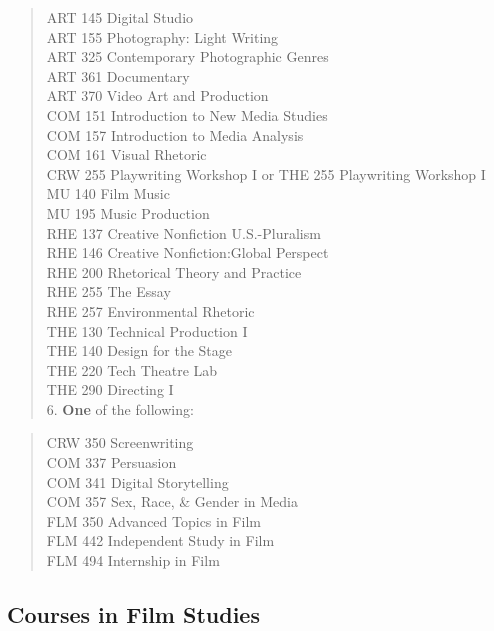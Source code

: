 \documentclass[
  letterpaper,
]{scrbook}
\begin{document}
\begin{quote}
ART 145 Digital Studio\\
ART 155 Photography: Light Writing\\
ART 325 Contemporary Photographic Genres\\
ART 361 Documentary\\
ART 370 Video Art and Production\\
COM 151 Introduction to New Media Studies\\
COM 157 Introduction to Media Analysis\\
COM 161 Visual Rhetoric\\
CRW 255 Playwriting Workshop I or THE 255 Playwriting Workshop I\\
MU 140 Film Music\\
MU 195 Music Production\\
RHE 137 Creative Nonfiction U.S.-Pluralism\\
RHE 146 Creative Nonfiction:Global Perspect\\
RHE 200 Rhetorical Theory and Practice\\
RHE 255 The Essay\\
RHE 257 Environmental Rhetoric\\
THE 130 Technical Production I\\
THE 140 Design for the Stage\\
THE 220 Tech Theatre Lab\\
THE 290 Directing I\\
6. \textbf{One} of the following:
\end{quote}

\begin{quote}
CRW 350 Screenwriting\\
COM 337 Persuasion\\
COM 341 Digital Storytelling\\
COM 357 Sex, Race, \& Gender in Media\\
FLM 350 Advanced Topics in Film\\
FLM 442 Independent Study in Film\\
FLM 494 Internship in Film
\end{quote}

\subsection{Courses in Film Studies}\label{courses-in-film-studies}
\end{document}
